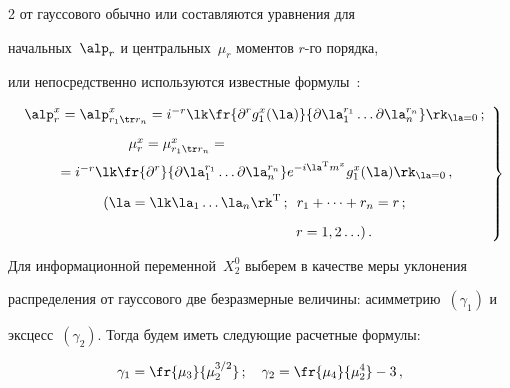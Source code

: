 \begin{multicols}{2}
 от гауссового обычно или составляются уравнения для


начальных~$\alp_r$ и центральных~$\mu_r$ моментов $r$-го порядка,


или непосредственно используются известные формулы~\cite{11-mar}:


    \begin{equation}


    \left.\begin{array}{c}


    \alp_r^x =\alp_{r_1\tr r_n}^x = i^{-r}\lk


\displaystyle    \fr{\partial^r g_1^x(\la)}{\partial \la_1^{r_1}\ldots \partial \la_n^{r_n}}\rk_{\la=0}\,;\\[9pt]


\hspace*{-38mm}\mu_r^x =\mu_{r_1\tr r_n}^x={}\\[6pt]


    {}= i^{-r}\lk


\displaystyle\fr{\partial^r }{ \partial \la_1^{r_1}\ldots \partial \la_n^{r_n}} 


e^{-i\la^{\mathrm{T}} m^x}g_1^x(\la)\rk_{\la=0}\,,\\[9pt]


    (\la=\lk \la_1\ldots \la_n\rk^{\mathrm{T}}\,;\enskip  r_1+\cdots+r_n = r\,;\\[9pt]


    \hspace*{40mm}r=1,2\ldots)\,.


    \end{array}


    \right \}


    \label{e48-mar}


    \end{equation}





Для информационной переменной~$X_2^0$ выберем в качестве меры уклонения 


распределения от гауссового две безразмерные величины: асим\-мет\-рию~$(\gamma_1)$ и 


эксцесс~$(\gamma_2)$. Тогда будем иметь сле\-ду\-ющие расчетные формулы:


    \begin{equation}


    \gamma_1 =\fr{\mu_3}{\mu_2^{3/2}}\,;\quad \gamma_2 = \fr{\mu_4}{\mu_2^4}-3\,,


    \label{e49-mar}



\end{equation}
\end{multicols}
